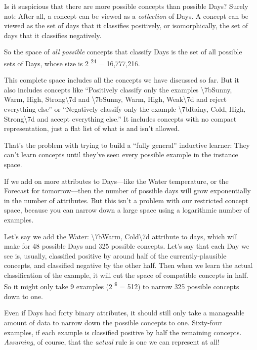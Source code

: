 {
 Is it suspicious that there are more possible concepts than
possible Days? Surely not: After all, a concept can be viewed as a
\textit{collection} of Days. A concept can be viewed as the set of days
that it classifies positively, or isomorphically, the set of days that
it classifies negatively.}

{
 So the space of \textit{all possible} concepts that classify Days
is the set of all possible sets of Days, whose size is
2\textsuperscript{ 24} = 16,777,216.}

{
 This complete space includes all the concepts we have discussed so
far. But it also includes concepts like ``Positively
classify only the examples {\textbackslash}{\textquotesingle}7bSunny,
Warm, High, Strong{\textbackslash}{\textquotesingle}7d and
{\textbackslash}{\textquotesingle}7bSunny, Warm, High,
Weak{\textbackslash}{\textquotesingle}7d and reject everything
else'' or ``Negatively classify only
the example {\textbackslash}{\textquotesingle}7bRainy, Cold, High,
Strong{\textbackslash}{\textquotesingle}7d and accept everything
else.'' It includes concepts with no compact
representation, just a flat list of what is and isn't
allowed.}

{
 That's the problem with trying to build a
``fully general'' inductive learner:
They can't learn concepts until they've
seen every possible example in the instance space.}

{
 If we add on more attributes to Days---like the Water temperature,
or the Forecast for tomorrow---then the number of possible days will
grow exponentially in the number of attributes. But this
isn't a problem with our restricted concept space,
because you can narrow down a large space using a logarithmic number of
examples.}

{
 Let's say we add the Water:
{\textbackslash}{\textquotesingle}7bWarm,
Cold{\textbackslash}{\textquotesingle}7d attribute to days, which will
make for 48 possible Days and 325 possible concepts.
Let's say that each Day we see is, usually, classified
positive by around half of the currently-plausible concepts, and
classified negative by the other half. Then when we learn the actual
classification of the example, it will cut the space of compatible
concepts in half. So it might only take 9 examples
(2\textsuperscript{ 9} = 512) to narrow 325 possible concepts down to
one.}

{
 Even if Days had forty binary attributes, it should still only
take a manageable amount of data to narrow down the possible concepts
to one. Sixty-four examples, if each example is classified positive by
half the remaining concepts. \textit{Assuming}, of course, that the
\textit{actual} rule is one we can represent at all!}

